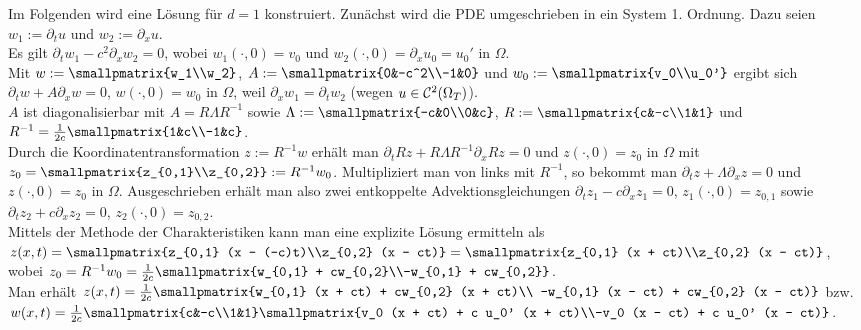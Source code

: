 \begin{Bem}
    Im Folgenden wird eine Lösung für $d = 1$ konstruiert.
    Zunächst wird die PDE umgeschrieben in ein System 1. Ordnung.
    Dazu seien $w_1 := \partial_t u$ und $w_2 := \partial_x u$.\\
    Es gilt $\partial_t w_1 - c^2 \partial_x w_2 = 0$,
    wobei $w_1(\cdot, 0) = v_0$ und $w_2(\cdot, 0) = \partial_x u_0 = u_0'$ in $\Omega$.\\
    Mit $w := \smallpmatrix{w_1\\w_2}$, $A := \smallpmatrix{0&-c^2\\-1&0}$ und
    $w_0 := \smallpmatrix{v_0\\u_0'}$ ergibt sich
    $\partial_t w + A \partial_x w = 0$, $w(\cdot, 0) = w_0$ in $\Omega$,
    weil $\partial_x w_1 = \partial_t w_2$ (wegen $u \in \mathcal{C}^2(\Omega_T)$).\\
    $A$ ist diagonalisierbar mit $A = R\Lambda R^{-1}$ sowie
    $\Lambda := \smallpmatrix{-c&0\\0&c}$,
    $R := \smallpmatrix{c&-c\\1&1}$ und $R^{-1} = \frac{1}{2c} \smallpmatrix{1&c\\-1&c}$.\\
    Durch die Koordinatentransformation $z := R^{-1} w$ erhält man
    $\partial_t Rz + R\Lambda R^{-1} \partial_x Rz = 0$ und $z(\cdot, 0) = z_0$ in $\Omega$
    mit $z_0 = \smallpmatrix{z_{0,1}\\z_{0,2}} := R^{-1} w_0$.
    Multipliziert man von links mit $R^{-1}$, so bekommt man
    $\partial_t z + \Lambda \partial_x z = 0$ und $z(\cdot, 0) = z_0$ in $\Omega$.
    Ausgeschrieben erhält man also zwei entkoppelte Advektionsgleichungen
    $\partial_t z_1 - c \partial_x z_1 = 0$,
    $z_1(\cdot, 0) = z_{0,1}$ sowie
    $\partial_t z_2 + c \partial_x z_2 = 0$,
    $z_2(\cdot, 0) = z_{0,2}$.\\
    Mittels der Methode der Charakteristiken kann man eine explizite Lösung ermitteln als\\
    $z(x, t) = \smallpmatrix{z_{0,1} (x - (-c)t)\\z_{0,2} (x - ct)}
    = \smallpmatrix{z_{0,1} (x + ct)\\z_{0,2} (x - ct)}$,
    wobei $z_0 = R^{-1} w_0 =
    \frac{1}{2c} \smallpmatrix{w_{0,1} + cw_{0,2}\\-w_{0,1} + cw_{0,2}}$.\\
    Man erhält
    $z(x, t) = \frac{1}{2c} \smallpmatrix{w_{0,1} (x + ct) + cw_{0,2} (x + ct)\\
    -w_{0,1} (x - ct) + cw_{0,2} (x - ct)}$ bzw.
    $w(x, t) = \frac{1}{2c} \smallpmatrix{c&-c\\1&1}
    \smallpmatrix{v_0 (x + ct) + c u_0' (x + ct)\\-v_0 (x - ct) + c u_0' (x - ct)}$.
\end{Bem}

